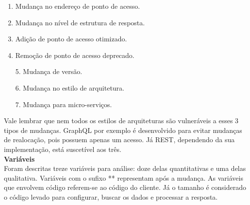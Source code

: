 \begin{description}[leftmargin=8em,style=nextline]
  \item[\textbf{Realocação}] 
  \begin{enumerate}
  \item Mudança no endereço de ponto de acesso.
  \item Mudança no nível de estrutura de resposta.
  \item Adição de ponto de acesso otimizado.
  \item Remoção de ponto de acesso deprecado.
  \end{enumerate}
  \item[\textbf{Transição}] 
  \begin{enumerate}
  \item[5.] Mudança de versão.
  \item[6.] Mudança no estilo de arquitetura.
  \end{enumerate}
  \item[\textbf{Composição}]
  \begin{enumerate}
  \item[7.] Mudança para micro-serviços.
  \end{enumerate}
\end{description}

Vale lembrar que nem todos os estilos de arquiteturas são vulneráveis a esses 3 tipos de mudanças. GraphQL por exemplo é desenvolvido para evitar mudanças de realocação, pois possuem apenas um acesso. Já REST, dependendo da sua implementação, está suscetível aos três. \\

\textbf{Variáveis} \\

Foram descritas treze variáveis para análise: doze delas quantitativas e uma delas qualitativa. Variáveis com o sufixo ** representam após a mudança. As variáveis que envolvem código referem-se ao código do cliente. Já o tamanho é considerado o código levado para configurar, buscar os dados e processar a resposta.

